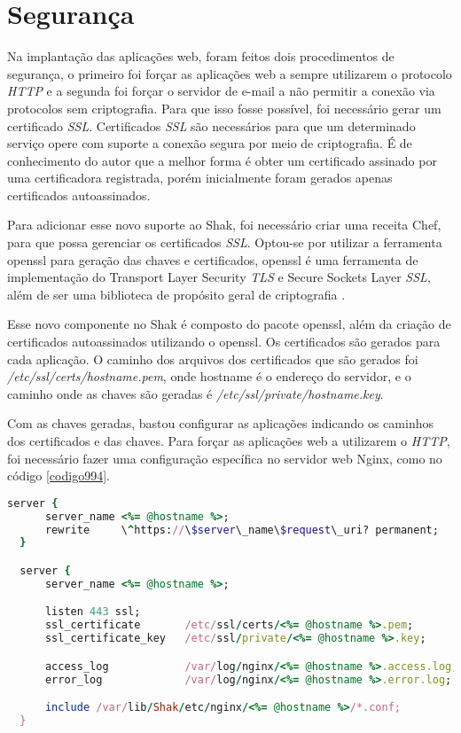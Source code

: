 \section{Segurança}
\label{sub:seguranca}

Na implantação das aplicações web, foram feitos dois procedimentos de segurança, o primeiro
foi forçar as aplicações web a sempre utilizarem o protocolo \textit{HTTP} e a segunda foi forçar o
servidor de e-mail a não permitir a conexão via protocolos sem criptografia. Para que 
isso fosse possível, foi necessário gerar um certificado \textit{SSL}. Certificados 
\textit{SSL} são necessários para que um determinado serviço opere com suporte 
a conexão segura por meio de criptografia.
É de conhecimento do autor que a melhor forma é obter um certificado assinado
por uma certificadora registrada, porém inicialmente foram gerados apenas certificados
autoassinados.

Para adicionar esse novo suporte ao Shak, foi necessário criar uma receita Chef,
para que possa gerenciar os certificados \textit{SSL}. Optou-se por utilizar a ferramenta
openssl para geração das chaves e certificados, openssl é uma ferramenta de
implementação do Transport Layer Security \textit{TLS} e Secure Sockets Layer \textit{SSL},
além de ser uma biblioteca de propósito geral de criptografia \cite{openssl}.

Esse novo componente no Shak é composto do pacote openssl, além da criação
de certificados autoassinados utilizando o openssl. Os certificados são gerados 
para cada aplicação. O caminho dos arquivos dos certificados que 
são gerados foi \textit{/etc/ssl/certs/hostname.pem}, onde hostname é o endereço 
do servidor,
e o caminho onde as chaves são geradas é \textit{/etc/ssl/private/hostname.key}.

Com as chaves geradas, bastou configurar as aplicações indicando os caminhos dos certificados
e das chaves. Para forçar as aplicações web a utilizarem o \textit{HTTP}, foi necessário fazer
uma configuração específica no servidor web Nginx, como no código \ref{codigo994}.

\begin{lstlisting}[language=Ruby,label=dice_index,caption={Exemplo de arquivo de configuração do Nginx para aplicações web no shak}, label=codigo994]
  server {
      server_name <%= @hostname %>;
      rewrite     \^https://\$server\_name\$request\_uri? permanent;
  }

  server {
      server_name <%= @hostname %>;

      listen 443 ssl;
      ssl_certificate       /etc/ssl/certs/<%= @hostname %>.pem;
      ssl_certificate_key   /etc/ssl/private/<%= @hostname %>.key;

      access_log            /var/log/nginx/<%= @hostname %>.access.log;
      error_log             /var/log/nginx/<%= @hostname %>.error.log;

      include /var/lib/Shak/etc/nginx/<%= @hostname %>/*.conf;
  }
\end{lstlisting}


